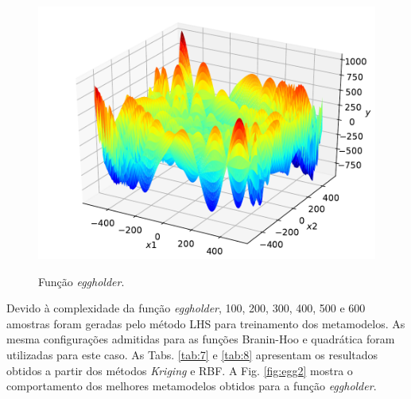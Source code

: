 \begin{figure}[H]
	\centering
	{\includegraphics[width=0.65\linewidth]{tatiane/fig_tati/eggholder/fig2_eggholder.pdf}} 	
	\caption{Função \textit{eggholder}.} 
	\label{fig:eggholder}
\end{figure}

Devido à complexidade da função {\it eggholder}, 100, 200, 300, 400, 500 e 600 amostras foram geradas pelo método LHS para treinamento dos metamodelos. As mesma configurações admitidas para as funções Branin-Hoo e quadrática foram utilizadas para este caso. As Tabs. \ref{tab:7} e \ref{tab:8} apresentam os resultados obtidos a partir dos métodos {\it Kriging} e RBF. A Fig. \ref{fig:egg2} mostra o comportamento dos melhores metamodelos obtidos para a função \textit{eggholder}.\\

